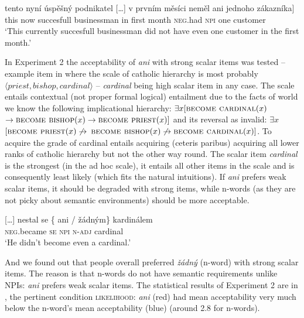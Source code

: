 \documentclass[output=paper,
]{langscibook}
\begin{document}
\ea\label{ex-41} \gll tento nyní úspěšný podnikatel {[}\ldots{}{]} v prvním měsíci neměl \minsp{[} ani jednoho zákazníka]\\
this now succesfull businessman {} in first month \textsc{neg}.had {} \textsc{npi} one customer {}\\
\glt `This currently succesfull businessman did not have even one customer in the first month.'
\z

\noindent\sloppy In Experiment 2 the acceptability of \textit{ani} with strong scalar items was tested -- example item in  where the scale of catholic hierarchy is most probably $\langle priest, bishop, cardinal\rangle$ -- \textit{cardinal} being high scalar item in any case. The scale entails contextual (not proper formal logical) entailment due to the facts of world we know the following implicational hierarchy: $\exists x[\textsc{become cardinal}(x)$ $\rightarrow \textsc{become bishop}(x) \rightarrow \textsc{become priest}(x)]$ and its reversal as invalid: $\exists x$ $[\textsc{become priest}(x) \not\rightarrow$ $\textsc{become bishop}(x) \not\rightarrow \textsc{become cardinal}(x)]$. To acquire the grade of cardinal entails acquiring (ceteris paribus) acquiring all lower ranks of catholic hierarchy but not the other way round. The scalar item \textit{cardinal} is the strongest (in the ad hoc scale), it entails all other items in the scale and is consequently least likely (which fits the natural intuitions). If \textit{ani} prefers weak scalar items, it should be degraded with strong items, while n-words (as they are not picky about semantic environments) should be more acceptable.

\ea \label{ex-42} {[{\ldots{}}]} \gll nestal se \{\hspace{-2pt} ani / žádným\} kardinálem\\
\textsc{neg.}became \textsc{se} {} \textsc{npi} {} \textsc{n-adj} cardinal\\
\glt `He didn't become even a cardinal.'
\z

\noindent And we found out that people overall preferred \textit{žádný} (n-word) with strong scalar items. The reason is that n-words do not have semantic requirements unlike NPIs: \textit{ani} prefers weak scalar items. The statistical results of Experiment 2 are in  , the pertinent condition \textsc{likelihood}: \textit{ani} (red) had mean acceptability very much below the n-word's mean acceptability (blue) (around 2.8 for n-words).
\end{document}

